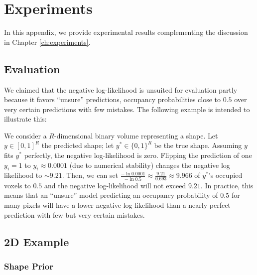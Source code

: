 \chapter{Experiments}
\label{ch:appendix-experiments}

In this appendix, we provide experimental results complementing the
discussion in Chapter \ref{ch:experiments}. 

\section{Evaluation}
\label{sec:appendix-experiments-evaluation}

We claimed that the negative log-likelihood is unsuited for evaluation
partly because it favors ``unsure'' predictions, \ie occupancy probabilities
close to $0.5$ over very certain predictions with few mistakes. The following
example is intended to illustrate this:

\begin{example}
  We consider a $R$-dimensional binary volume representing a shape. Let 
  $y \in [0,1]^R$ the predicted shape; let $y^* \in \{0,1\}^R$ be the true shape.
  Assuming $y$ fits $y^*$ perfectly, the negative log-likelihood is zero.
  Flipping the prediction of one $y_i = 1$ to $y_i \approx 0.0001$ (due to
  numerical stability) changes the negative log likelihood to $\sim 9.21$.
  Then, we can set
  $\frac{-\ln 0.0001}{- \ln 0.5} \approx \frac{9.21}{0.693} \approx 9.966$
  of $y^*$'s occupied voxels to $0.5$ and the negative log-likelihood will not exceed $9.21$.
  In practice, this means that an ``unsure'' model predicting an occupancy probability
  of $0.5$ for many pixels will have a lower negative log-likelihood
  than a nearly perfect prediction with few but very certain mistakes.
\end{example}

\section{2D Example}
\label{sec:appendix-experiments-2d}

\subsection{Shape Prior}

